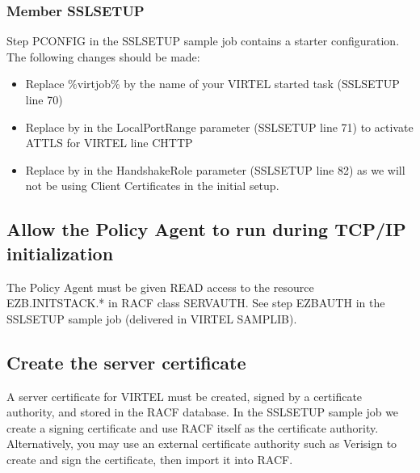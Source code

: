\documentclass[letterpaper,10pt,english]{sphinxmanual}
\begin{document}
\subsubsection{Member SSLSETUP}
\label{\detokenize{connectivity_guide:member-sslsetup}}
\sphinxAtStartPar
Step PCONFIG in the SSLSETUP sample job contains a starter configuration. The following changes should be made:
\begin{itemize}
\item {} 
\sphinxAtStartPar
Replace \%virtjob\% by the name of your VIRTEL started task (SSLSETUP line 70)

\item {} 
\sphinxAtStartPar
Replace  by  in the LocalPortRange parameter (SSLSETUP line 71) to activate AT\sphinxhyphen{}TLS for VIRTEL line C\sphinxhyphen{}HTTP

\item {} 
\sphinxAtStartPar
Replace  by  in the HandshakeRole parameter (SSLSETUP line 82) as we will not be using Client Certificates in the initial setup.

\end{itemize}


\subsection{Allow the Policy Agent to run during TCP/IP initialization}
\label{\detokenize{connectivity_guide:allow-the-policy-agent-to-run-during-tcp-ip-initialization}}
\sphinxAtStartPar
The Policy Agent must be given READ access to the resource EZB.INITSTACK.* in RACF class SERVAUTH. See step EZBAUTH in the SSLSETUP sample job (delivered in VIRTEL SAMPLIB).


\subsection{Create the server certificate}
\label{\detokenize{connectivity_guide:create-the-server-certificate}}
\sphinxAtStartPar
A server certificate for VIRTEL must be created, signed by a certificate authority, and stored in the RACF database. In the SSLSETUP sample job we create a signing certificate and use RACF itself as the certificate authority. Alternatively, you may use an external certificate authority such as Verisign to create and sign the certificate, then import it into RACF.
\end{document}

